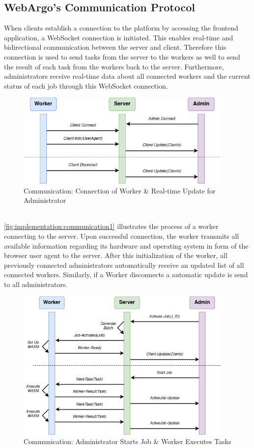\subsection{WebArgo's Communication Protocol}
\label{subsec:implementation:architecture:communication}
When clients establish a connection to the platform by accessing the frontend application, a WebSocket connection is initiated. This enables real-time and bidirectional communication between the server and client. Therefore this connection is used to send tasks from the server to the workers as well to send the result of each task from the workers back to the server. Furthermore, administrators receive real-time data about all connected workers and the current status of each job through this WebSocket connection.
\begin{figure}[htbp]
    \centering
    \includegraphics[width=0.95\textwidth]{gfx/figures/communication-connection.png}
    \caption{Communication: Connection of Worker \& Real-time Update for Administrator}
    \label{fig:implementation:communication1}
\end{figure}
~\\
\autoref{fig:implementation:communication1} illustrates the process of a worker connecting to the server. Upon successful connection, the worker transmits all available information regarding its hardware and operating system in form of the browser user agent to the server. After this initialization of the worker, all previously connected administrators automatically receive an updated list of all connected workers. Similarly, if a Worker disconnects a automatic update is send to all administrators.
\begin{figure}[htbp]
    \centering
    \includegraphics[width=0.95\textwidth]{gfx/figures/communication-jobexecution.png}
    \caption{Communication: Administrator Starts Job \& Worker Executes Tasks}
    \label{fig:implementation:communication2}
\end{figure}
